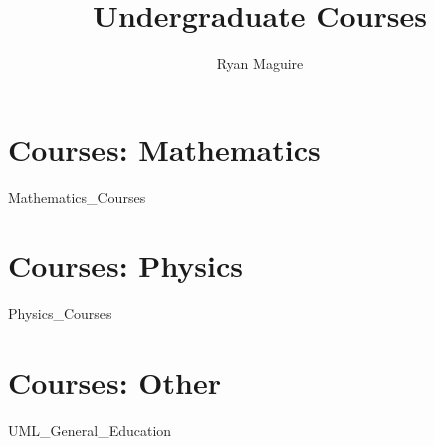 \documentclass[crop=false,class=book,oneside]{standalone}
\begin{document}
    \newif\ifcourses
    \ifstandalone
        \title{Undergraduate Courses}
        \author{Ryan Maguire}
        \date{\vspace{-5ex}}
        \maketitle
        \tableofcontents
        \listoffigures
        \listoftables
        \clearpage
    \fi
    \part{Courses: Mathematics}
        {Mathematics_Courses}
    \part{Courses: Physics}
        {Physics_Courses}
    \part{Courses: Other}
        {UML_General_Education}
\end{document}
